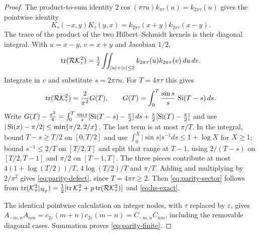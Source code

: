 \begin{proof}
The product-to-sum identity $2\cos(\pi\tau u)k_{\pi\tau}(u)=k_{2\pi\tau}(u)$
gives the pointwise identity
\[
 K_\tau(-x,y)K_\tau(y,x)
 =k_{2\pi\tau}(x+y)k_{2\pi\tau}(x-y).
\]
The trace of the product of the two Hilbert--Schmidt kernels is their
diagonal integral. With $u=x-y$, $v=x+y$ and Jacobian $1/2$,
\[
 \operatorname{tr}(\mathcal R\mathcal K_\tau^2)
 =\tfrac12\iint_{|u|+|v|\le2}k_{2\pi\tau}(u)k_{2\pi\tau}(v)\,du\,dv.
\]
Integrate in $v$ and substitute $s=2\pi\tau u$. For $T=4\pi\tau$ this gives
\begin{equation}\label{eq:parity-G}
 \operatorname{tr}(\mathcal R\mathcal K_\tau^2)=\frac2{\pi^2}G(T),
 \qquad G(T)=\int_0^T\frac{\sin s}{s}\,\operatorname{Si}(T-s)\,ds.
\end{equation}
Write $G(T)-\tfrac{\pi^2}4
=\int_0^T\frac{\sin s}{s}[\operatorname{Si}(T-s)-\tfrac\pi2]\,ds
 +\tfrac\pi2[\operatorname{Si}(T)-\tfrac\pi2]$ and use
$|\operatorname{Si}(x)-\pi/2|\le\min\{\pi/2,2/x\}$.  The last term is at most $\pi/T$.  In
the integral, bound $T-s\ge T/2$ on $[0,T/2]$ and use
$\int_0^X|\sin s|s^{-1}ds\le1+\log X$ for $X\ge1$; bound $s^{-1}\le2/T$ on
$[T/2,T]$ and split that range at $T-1$, using $2/(T-s)$ on $[T/2,T-1]$ and
$\pi/2$ on $[T-1,T]$.  The three pieces contribute at most
$4(1+\log(T/2))/T$, $4\log(T/2)/T$ and $\pi/T$.  Adding and multiplying by
$2/\pi^2$ gives \eqref{eq:parity-defect}, since $T=4\pi\tau\ge2$.
Then \eqref{eq:parity-sector} follows from
$\operatorname{tr}(\mathcal K_\tau^2|_{\mathcal H_p})
 =\tfrac12[\operatorname{tr}\mathcal K_\tau^2+p\operatorname{tr}(\mathcal R\mathcal K_\tau^2)]$ and
\eqref{eq:hs-exact}.

The identical pointwise calculation on integer nodes, with $\tau$ replaced
by $\varepsilon$, gives
$A_{-m,n}A_{nm}=c_{2\varepsilon}(m+n)c_{2\varepsilon}(m-n)
=C_{-m,n}C_{nm}$, including the removable diagonal cases.
Summation proves \eqref{eq:parity-finite}.
\end{proof}

